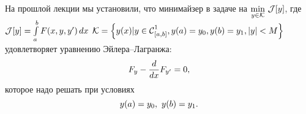 \chapter{}
\label{lecture2}

\noindent На прошлой лекции мы установили, что минимайзер в задаче на $\min\limits_{y\in\K}\,\J[y]$, где  $\J[y]=\int\limits_a^b F(x,y,y')\,dx$ $\K=\left\{y(x)|y\in\Cfn[{[a,b]}]{1}, y(a)=y_0, y(b)=y_1, |y|<M\right\}$ удовлетворяет уравнению Эйлера--Лагранжа:
\begin{equation}
	\label{l2:eq:1}
	\hfill F_y-\der{}{x}F_{y'}=0,\hfill
\end{equation} 
которое надо решать при условиях 
\begin{equation}
	\label{l2:eq:2}
	\hfill y(a)=y_0,\ y(b)=y_1.\hfill
\end{equation}

